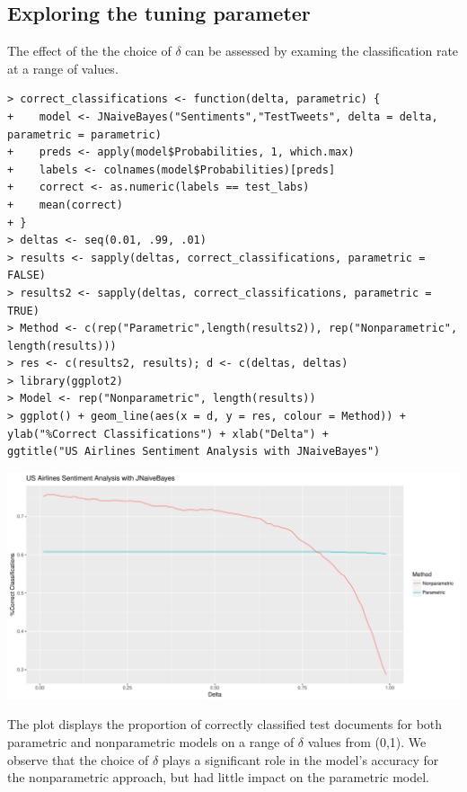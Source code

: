 \documentclass[a4paper]{article}
\begin{document}
\subsection{Exploring the tuning parameter}
The effect of the the choice of $\delta$ can be assessed by examing the classification rate at a range of values.
{\footnotesize{
\begin{verbatim}
> correct_classifications <- function(delta, parametric) {
+    model <- JNaiveBayes("Sentiments","TestTweets", delta = delta, parametric = parametric)
+    preds <- apply(model$Probabilities, 1, which.max)
+    labels <- colnames(model$Probabilities)[preds]
+    correct <- as.numeric(labels == test_labs)
+    mean(correct)
+ }
> deltas <- seq(0.01, .99, .01)
> results <- sapply(deltas, correct_classifications, parametric = FALSE)
> results2 <- sapply(deltas, correct_classifications, parametric = TRUE)
> Method <- c(rep("Parametric",length(results2)), rep("Nonparametric", length(results)))
> res <- c(results2, results); d <- c(deltas, deltas)
> library(ggplot2)
> Model <- rep("Nonparametric", length(results))
> ggplot() + geom_line(aes(x = d, y = res, colour = Method)) + 
ylab("%Correct Classifications") + xlab("Delta") + 
ggtitle("US Airlines Sentiment Analysis with JNaiveBayes")

\end{verbatim}}}
\begin{center}
\includegraphics[scale=.6]{comparison.pdf}
\end{center}
The plot displays the proportion of correctly classified test documents for both parametric and nonparametric models on a range of $\delta$ values from (0,1). We observe that the choice of $\delta$ plays a significant role in the model's accuracy for the nonparametric approach, but had little impact on the parametric model.
\end{document}
